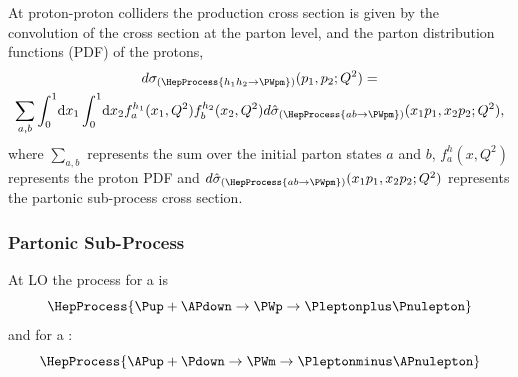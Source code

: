 At proton-proton colliders the \PW production cross section is given by the
convolution of the cross section at the parton level, and the parton
distribution functions (PDF) of the protons,
\begin{multline}
  d\sigma_{(\HepProcess{h_1 h_2 \to \PWpm})}(p_1,p_2;Q^{2}) = \\
  \sum\limits_{a,b}
  \int_0^1 \! \mathrm{d} x_1 
  \int_0^1 \! \mathrm{d} x_2 
  f_a^{h_1}(x_1,Q^2)
  f_b^{h_2}(x_2,Q^2) 
  d\hat{\sigma}_{(\HepProcess{a b \to \PWpm})}(x_1 p_1, x_2 p_2; Q^2),
  \label{wbos:xsec}
\end{multline}
where $\sum\limits_{a,b}$ represents the sum over the initial parton states $a$
and $b$, $f_a^{h}(x,Q^2)$ represents the proton {PDF} and
$d\hat{\sigma}_{(\HepProcess{a b \to \PWpm})}(x_1 p_1, x_2 p_2; Q^2)$
represents the partonic sub-process cross section.

\subsubsection*{Partonic Sub-Process}

At {LO} the process for a \PWp is
\begin{equation}
  \HepProcess{\Pup + \APdown \to \PWp \to \Pleptonplus \Pnulepton} 
  \label{wbos:wpprod} 
\end{equation}
and for a \PWm:
\begin{equation}
  \HepProcess{\APup + \Pdown \to \PWm \to \Pleptonminus \APnulepton}
  \label{wbos:wmprod} 
\end{equation}

